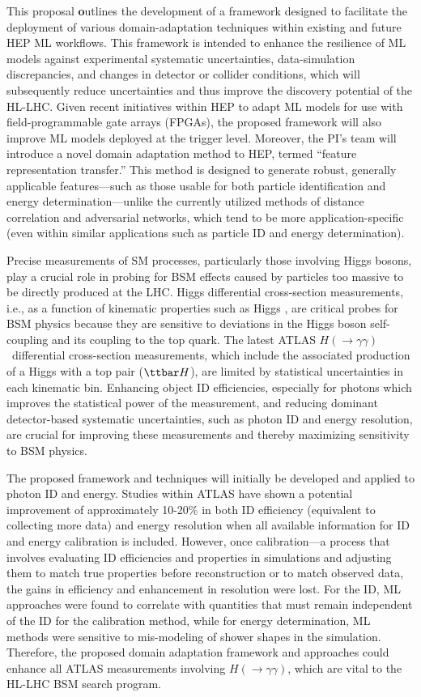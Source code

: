 \documentclass[letter, USenglish, 11pt, subfigure]{article}
\newcommand{\tth}{\ensuremath{\ttbar H}}
\newcommand{\hyy}{\ensuremath{H(\to\gamma\gamma)}}
\begin{document}
This proposal {\textbf outlines the development of a framework designed to facilitate the deployment of various domain-adaptation techniques within existing and future HEP ML workflows. This framework is intended to enhance the resilience of ML models against experimental systematic uncertainties, data-simulation discrepancies, and changes in detector or collider conditions, which will subsequently reduce uncertainties and thus improve the discovery potential of the HL-LHC.} Given recent initiatives within HEP to adapt ML models for use with field-programmable gate arrays (FPGAs), the proposed framework will also improve ML models deployed at the trigger level. Moreover, the PI's team will introduce a novel domain adaptation method to HEP, termed ``feature representation transfer.'' This method is designed to generate robust, generally applicable features—such as those usable for both particle identification and energy determination—unlike the currently utilized methods of distance correlation and adversarial networks, which tend to be more application-specific (even within similar applications such as particle ID and energy determination).

Precise measurements of SM processes, particularly those involving Higgs bosons, play a crucial role in probing for BSM effects caused by particles too massive to be directly produced at the LHC. Higgs differential cross-section measurements, i.e., as a function of kinematic properties such as Higgs \pt, are critical probes for BSM physics because they are sensitive to deviations in the Higgs boson self-coupling and its coupling to the top quark. The latest ATLAS \hyy\ differential cross-section measurements, which include the associated production of a Higgs with a top pair (\tth), are limited by statistical uncertainties in each kinematic bin. Enhancing object ID efficiencies, especially for photons which improves the statistical power of the measurement, and reducing dominant detector-based systematic uncertainties, such as photon ID and energy resolution, are crucial for improving these measurements and thereby maximizing sensitivity to BSM physics.

The proposed framework and techniques will initially be developed and applied to photon ID and energy. Studies within ATLAS have shown a potential improvement of approximately 10-20\% in both ID efficiency (equivalent to collecting more data) and energy resolution when all available information for ID and energy calibration is included. However, once calibration—a process that involves evaluating ID efficiencies and properties in simulations and adjusting them to match true properties before reconstruction or to match observed data, the gains in efficiency and enhancement in resolution were lost. For the ID, ML approaches were found to correlate with quantities that must remain independent of the ID for the calibration method, while for energy determination, ML methods were sensitive to mis-modeling of shower shapes in the simulation. Therefore, the proposed domain adaptation framework and approaches could enhance all ATLAS measurements involving \hyy, which are vital to the HL-LHC BSM search program.
\end{document}
